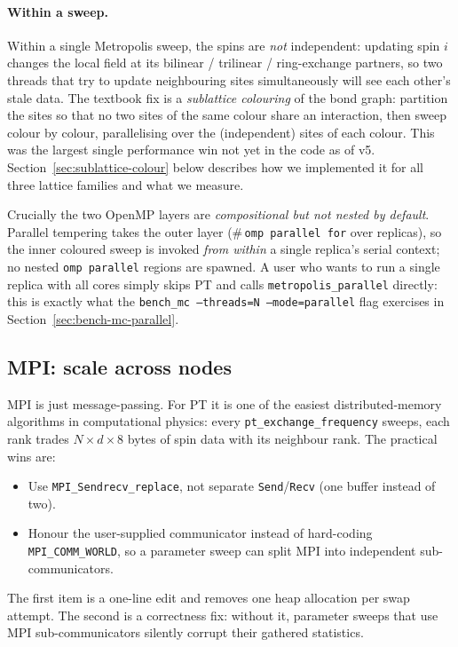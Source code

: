 \documentclass[11pt,letterpaper]{article}
\begin{document}
\paragraph{Within a sweep.}
Within a single Metropolis sweep, the spins are \emph{not} independent:
updating spin $i$ changes the local field at its bilinear / trilinear /
ring-exchange partners, so two threads that try to update neighbouring
sites simultaneously will see each other's stale data.  The textbook
fix is a \emph{sublattice colouring} of the bond graph: partition the
sites so that no two sites of the same colour share an interaction, then
sweep colour by colour, parallelising over the (independent) sites of
each colour.  This was the largest single performance win not yet in the
code as of v5.  Section~\ref{sec:sublattice-colour} below describes how
we implemented it for all three lattice families and what we measure.

Crucially the two OpenMP layers are \emph{compositional but not nested
by default}.  Parallel tempering takes the outer layer
(\(\#\)\,\texttt{omp parallel for} over replicas), so the inner coloured
sweep is invoked \emph{from within} a single replica's serial context;
no nested \texttt{omp parallel} regions are spawned.  A user who wants
to run a single replica with all cores simply skips PT and calls
\texttt{metropolis\_parallel} directly: this is exactly what the
\texttt{bench\_mc --threads=N --mode=parallel} flag exercises in
Section~\ref{sec:bench-mc-parallel}.

\subsection{MPI: scale across nodes}
MPI is just message-passing.  For PT it is one of the easiest
distributed-memory algorithms in computational physics: every
\texttt{pt\_exchange\_frequency} sweeps, each rank trades
$N \times d \times 8$ bytes of spin data with its neighbour rank.  The
practical wins are:
\begin{itemize}[noitemsep]
  \item Use \texttt{MPI\_Sendrecv\_replace}, not separate
        \texttt{Send}/\texttt{Recv} (one buffer instead of two).
  \item Honour the user-supplied communicator instead of hard-coding
        \texttt{MPI\_COMM\_WORLD}, so a parameter sweep can split MPI
        into independent sub-communicators.
\end{itemize}
The first item is a one-line edit and removes one heap allocation per
swap attempt.  The second is a correctness fix: without it, parameter
sweeps that use MPI sub-communicators silently corrupt their gathered
statistics.
\end{document}

